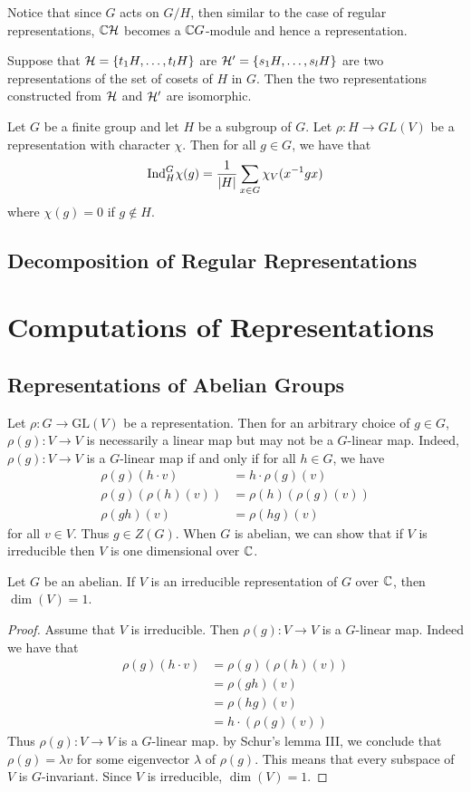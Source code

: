 \documentclass[a4paper]{article}
\begin{document}
Notice that since $G$ acts on $G/H$, then similar to the case of regular representations, $\mathbb{C}\mathcal{H}$ becomes a $\mathbb{C} G$-module and hence a representation. 

\begin{thm}{}{} Suppose that $\mathcal{H}=\{t_1H,\dots,t_lH\}$ are $\mathcal{H}'=\{s_1H,\dots,s_lH\}$ are two representations of the set of cosets of $H$ in $G$. Then the two representations constructed from $\mathcal{H}$ and $\mathcal{H}'$ are isomorphic. 
\end{thm}

\begin{lmm}{}{} Let $G$ be a finite group and let $H$ be a subgroup of $G$. Let $\rho:H\to GL(V)$ be a representation with character $\chi$. Then for all $g\in G$, we have that $$\text{Ind}_H^G\chi(g)=\frac{1}{\abs{H}}\sum_{x\in G}\chi_V(x^{-1}gx)$$ where $\chi(g)=0$ if $g\notin H$. 
\end{lmm}

\subsection{Decomposition of Regular Representations}

\pagebreak
\section{Computations of Representations}
\subsection{Representations of Abelian Groups}
Let $\rho:G\to\text{GL}(V)$ be a representation. Then for an arbitrary choice of $g\in G$, $\rho(g):V\to V$ is necessarily a linear map but may not be a $G$-linear map. Indeed, $\rho(g):V\to V$ is a $G$-linear map if and only if for all $h\in G$, we have 
\begin{align*}
\rho(g)(h\cdot v)&=h\cdot\rho(g)(v)\\
\rho(g)(\rho(h)(v))&=\rho(h)(\rho(g)(v))\\
\rho(gh)(v)&=\rho(hg)(v)
\end{align*}
for all $v\in V$. Thus $g\in Z(G)$. When $G$ is abelian, we can show that if $V$ is irreducible then $V$ is one dimensional over $\mathbb{C}$. 

\begin{thm}{}{} Let $G$ be an abelian. If $V$ is an irreducible representation of $G$ over $\mathbb{C}$, then $\dim(V)=1$. \tcbline
\begin{proof}
Assume that $V$ is irreducible. Then $\rho(g):V\to V$ is a $G$-linear map. Indeed we have that 
\begin{align*}
\rho(g)(h\cdot v)&=\rho(g)(\rho(h)(v))\\
&=\rho(gh)(v)\\
&=\rho(hg)(v)\\
&=h\cdot(\rho(g)(v))
\end{align*}
Thus $\rho(g):V\to V$ is a $G$-linear map. by Schur's lemma III, we conclude that $\rho(g)=\lambda v$ for some eigenvector $\lambda$ of $\rho(g)$. This means that every subspace of $V$ is $G$-invariant. Since $V$ is irreducible, $\dim(V)=1$. 
\end{proof}
\end{thm}
\end{document}
